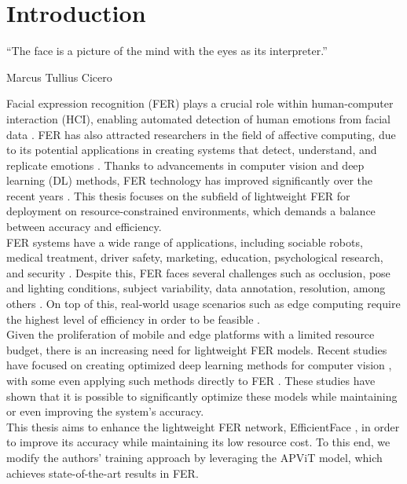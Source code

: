 \chapter{Introduction}
\label{chapter:introduction}


\epigraph{``The face is a picture of the mind with the eyes as its interpreter.''}{Marcus Tullius Cicero}

\newpage

Facial expression recognition (FER) plays a crucial role within human-computer interaction (HCI), enabling automated detection of human emotions from facial data \cite{li2022survey}. FER has also attracted researchers in the field of affective computing, due to its potential applications in creating systems that detect, understand, and replicate emotions \cite{karnati2023survey}. Thanks to advancements in computer vision and deep learning (DL) methods, FER technology has improved significantly over the recent years \cite{li2022survey}. This thesis focuses on the subfield of lightweight FER for deployment on resource-constrained environments, which demands a balance between accuracy and efficiency.\\

FER systems have a wide range of applications, including sociable robots, medical treatment, driver safety, marketing, education, psychological research, and security \cite{li2022survey, karnati2023survey, canal2022survey, sajjad2023survey}. Despite this, FER faces several challenges such as occlusion, pose and lighting conditions, subject variability, data annotation, resolution, among others \cite{li2022survey, sajjad2023survey}. On top of this, real-world usage scenarios such as edge computing require the highest level of efficiency in order to be feasible \cite{wu2020edge}.\\

Given the proliferation of mobile and edge platforms with a limited resource budget, there is an increasing need for lightweight FER models. Recent studies have focused on creating optimized deep learning methods for computer vision \cite{howard2017mobilenet, zhang2018shufflenet}, with some even applying such methods directly to FER \cite{eff-face2021, lengwe2023pattlite}. These studies have shown that it is possible to significantly optimize these models while maintaining or even improving the system's accuracy.\\

This thesis aims to enhance the lightweight FER network, EfficientFace \cite{eff-face2021}, in order to improve its accuracy while maintaining its low resource cost. To this end, we modify the authors' training approach by leveraging the APViT \cite{apvit2023} model, which achieves state-of-the-art results in FER.

